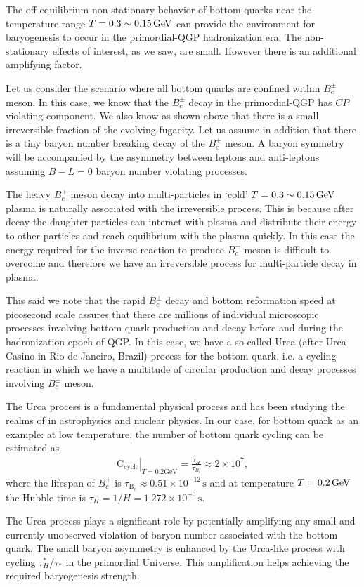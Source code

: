 The off equilibrium non-stationary behavior of bottom quarks near the temperature range $T=0.3\sim0.15\text{\,GeV}$ can provide the environment for baryogenesis to occur in the primordial-QGP hadronization era. The non-stationary effects of interest, as we saw, are small. However there is an additional amplifying factor. 
 
 Let us consider the scenario where all bottom quarks are confined within $B_c^\pm$ meson. In this case, we know that the $B_c^\pm$ decay in the primordial-QGP has $CP$ violating component. We also know as shown above that there is a small  irreversible fraction of the evolving fugacity. Let us assume in addition that  there is a tiny baryon number breaking decay of the $B^\pm_c$ meson. A baryon symmetry will be accompanied by the asymmetry between leptons and anti-leptons assuming $B-L=0$ baryon number violating processes.

The heavy $B_c^\pm$ meson decay into multi-particles in `cold' $T=0.3\sim0.15\text{\,GeV}$ plasma is  naturally associated with the irreversible process. This is because after decay the daughter particles can interact with plasma and distribute their energy to other particles and reach equilibrium with the plasma quickly. In this case the energy required for the inverse reaction to produce $B_c^\pm$ meson is difficult to overcome and therefore we have an irreversible process for multi-particle decay in plasma.

This said we note that the rapid $B_c^\pm$ decay and bottom reformation speed at picosecond scale assures that there are millions of individual microscopic processes involving bottom quark production and decay before and during the hadronization epoch of QGP. In this case, we have a so-called Urca (after Urca Casino in Rio de Janeiro, Brazil) process for the bottom quark, i.e. a cycling reaction in which we have a multitude of circular production and decay processes involving $B_c^\pm$ meson. 

The Urca process is a fundamental physical process and has been studying the realms of in astrophysics and nuclear physics. In our case, for bottom quark as an example: at low temperature, the number of bottom quark cycling can be estimated as
\begin{align}
\left.\mathrm{C_{cycle}}\right|_{T=0.2\mathrm{GeV}}=\frac{\tau_H}{\tau_{B_c}}\approx2\times10^7,
\end{align}
where the lifespan of $B_c^\pm$ is $\tau_{\mathrm{B}_c}\approx0.51\times10^{-12}\,\mathrm{s}$ and at temperature $T=0.2\text{\,GeV}$ the Hubble time is $\tau_H=1/H=1.272\times10^{-5}\,\mathrm{s}$. 

The Urca process plays a significant role by potentially amplifying any small and currently unobserved violation of baryon number associated with the bottom quark. The small baryon asymmetry is enhanced by the Urca-like process with cycling ${\tau^\ast_H}/{\tau_\ast}$ in the primordial Universe. This amplification helps achieving the required baryogenesis strength.
